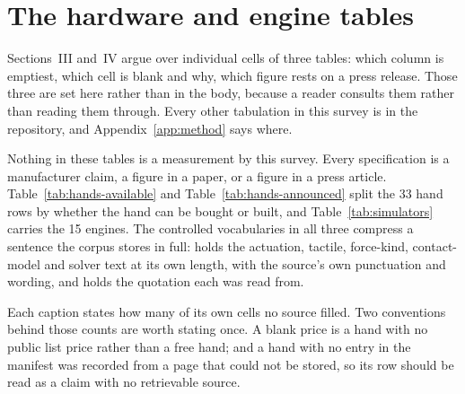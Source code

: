\section{The hardware and engine tables}
\label{app:tables}

Sections~III and~IV argue over individual cells of three tables: which column is emptiest, which
cell is blank and why, which figure rests on a press release. Those three are set here rather than
in the body, because a reader consults them rather than reading them through. Every other
tabulation in this survey is in the repository, and Appendix~\ref{app:method} says where.

Nothing in these tables is a measurement by this survey. Every specification is a manufacturer
claim, a figure in a paper, or a figure in a press article. Table~\ref{tab:hands-available} and
Table~\ref{tab:hands-announced} split the 33 hand rows by whether the hand can be bought or built,
and Table~\ref{tab:simulators} carries the 15 engines. The controlled vocabularies in all three
compress a sentence the corpus stores in full:  holds the actuation, tactile,
force-kind, contact-model and solver text at its own length, with the source's own punctuation and
wording, and  holds the quotation each was read from.

Each caption states how many of its own cells no source filled. Two conventions behind those counts
are worth stating once. A blank price is a hand with no public list price rather than a free hand;
and a hand with no entry in the manifest was recorded from a page that could not be stored, so its
row should be read as a claim with no retrievable source.










